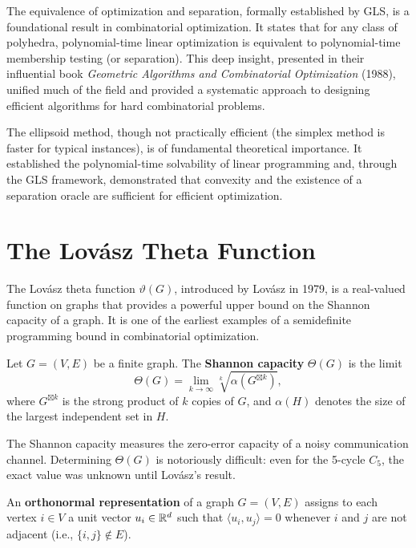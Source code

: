 The equivalence of optimization and separation, formally established by GLS, is a foundational result in combinatorial optimization. It states that for any class of polyhedra, polynomial-time linear optimization is equivalent to polynomial-time membership testing (or separation). This deep insight, presented in their influential book \textit{Geometric Algorithms and Combinatorial Optimization} (1988), unified much of the field and provided a systematic approach to designing efficient algorithms for hard combinatorial problems.

The ellipsoid method, though not practically efficient (the simplex method is faster for typical instances), is of fundamental theoretical importance. It established the polynomial-time solvability of linear programming and, through the GLS framework, demonstrated that convexity and the existence of a separation oracle are sufficient for efficient optimization.

\section{The Lov\'{a}sz Theta Function}

The Lov\'{a}sz theta function \(\vartheta(G)\), introduced by Lov\'{a}sz in 1979, is a real-valued function on graphs that provides a powerful upper bound on the Shannon capacity of a graph. It is one of the earliest examples of a semidefinite programming bound in combinatorial optimization.

\begin{definition}
Let \(G = (V,E)\) be a finite graph. The \textbf{Shannon capacity} \(\Theta(G)\) is the limit
\[
\Theta(G) = \lim_{k \to \infty} \sqrt[k]{\alpha(G^{\boxtimes k})},
\]
where \(G^{\boxtimes k}\) is the strong product of \(k\) copies of \(G\), and \(\alpha(H)\) denotes the size of the largest independent set in \(H\).
\end{definition}

The Shannon capacity measures the zero-error capacity of a noisy communication channel. Determining \(\Theta(G)\) is notoriously difficult: even for the 5-cycle \(C_5\), the exact value was unknown until Lov\'{a}sz's result.

\begin{definition}
An \textbf{orthonormal representation} of a graph \(G = (V,E)\) assigns to each vertex \(i \in V\) a unit vector \(u_i \in \mathbb{R}^d\) such that \(\langle u_i, u_j \rangle = 0\) whenever \(i\) and \(j\) are not adjacent (i.e., \(\{i,j\} \notin E\)).
\end{definition}

